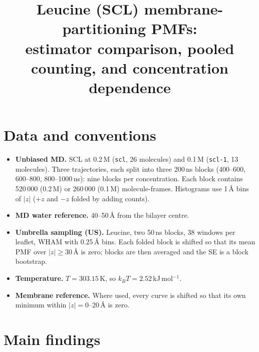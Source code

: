 \documentclass[11pt,a4paper]{article}
\title{Leucine (SCL) membrane-partitioning PMFs:\\
estimator comparison, pooled counting, and concentration dependence}
\date{}
\newcommand{\kJ}{\,kJ\,mol$^{-1}$}
\begin{document}
\maketitle

\section{Data and conventions}

\begin{itemize}
  \item \textbf{Unbiased MD.} SCL at 0.2\,M (\texttt{scl}, 26 molecules) and 0.1\,M
  (\texttt{scl-1}, 13 molecules). Three trajectories, each split into three 200\,ns blocks
  (400--600, 600--800, 800--1000\,ns): nine blocks per concentration. Each block contains
  520\,000 (0.2\,M) or 260\,000 (0.1\,M) molecule-frames. Histograms use 1\,\AA{} bins of $|z|$
  ($+z$ and $-z$ folded by adding counts).
  \item \textbf{MD water reference.} 40--50\,\AA{} from the bilayer centre.
  \item \textbf{Umbrella sampling (US).} Leucine, two 50\,ns blocks, 38 windows per leaflet,
  WHAM with 0.25\,\AA{} bins. Each folded block is shifted so that its mean PMF over
  $|z|\ge 30$\,\AA{} is zero; blocks are then averaged and the SE is a block bootstrap.
  \item \textbf{Temperature.} $T = 303.15$\,K, so $k_BT = 2.52$\kJ.
  \item \textbf{Membrane reference.} Where used, every curve is shifted so that its own minimum
  within $|z| = 0$--20\,\AA{} is zero.
\end{itemize}

\section{Main findings}
\end{document}
